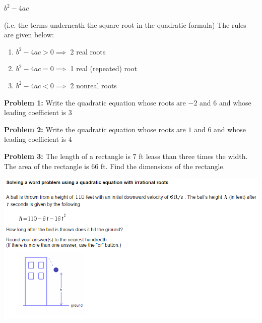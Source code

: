 \documentclass[12pt]{article}
\begin{document}
\centerline{$b^{2} - 4ac$}

 (i.e. the terms underneath the square root in the quadratic formula) The rules are given below:

\begin{enumerate}

\item $b^2 - 4ac > 0 \implies $ 2 real roots
\item $b^2 - 4ac = 0 \implies $ 1 real (repeated) root
\item $b^2 - 4ac < 0 \implies $ 2 nonreal roots

\end{enumerate}

\newpage

\textbf{Problem 1:} Write the quadratic equation whose roots are $-2$ and $6$ and whose leading coefficient is $3$

\vspace{2cm}

\textbf{Problem 2:} Write the quadratic equation whose roots are $1$ and $6$ and whose leading coefficient is $4$

\vspace{2cm}

\textbf{Problem 3:} The length of a rectangle is $7$ ft leass than three times the width. The area of the rectangle is $66$ ft. Find the dimensions of the rectangle.

\vspace{2cm}

\includegraphics[scale = 0.8]{WP.png}
\end{document}
